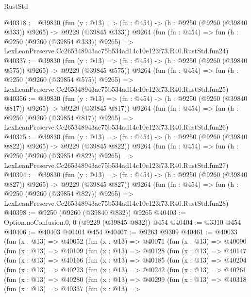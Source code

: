 \begin{lexlean}{RustStd}
\begin{coremodule}
@40318 := @39830
    (fun (y : @13) => (fn : @454) -> (h : @9250 (@9260 (@39840 @333)) @9265) -> @9229 (@39845 @333))
    @9264
    (fun (fn : @454) =>
    fun (h : @9250 (@9260 (@39854 @333)) @9265) =>
    LexLeanPreserve.Cc265348943ac75b534ad14c10e123f73.R40.RustStd.fun24)
@40337 := @39830
    (fun (y : @13) => (fn : @454) -> (h : @9250 (@9260 (@39840 @575)) @9265) -> @9229 (@39845 @575))
    @9264
    (fun (fn : @454) =>
    fun (h : @9250 (@9260 (@39854 @575)) @9265) =>
    LexLeanPreserve.Cc265348943ac75b534ad14c10e123f73.R40.RustStd.fun25)
@40356 := @39830
    (fun (y : @13) => (fn : @454) -> (h : @9250 (@9260 (@39840 @817)) @9265) -> @9229 (@39845 @817))
    @9264
    (fun (fn : @454) =>
    fun (h : @9250 (@9260 (@39854 @817)) @9265) =>
    LexLeanPreserve.Cc265348943ac75b534ad14c10e123f73.R40.RustStd.fun26)
@40375 := @39830
    (fun (y : @13) => (fn : @454) -> (h : @9250 (@9260 (@39840 @822)) @9265) -> @9229 (@39845 @822))
    @9264
    (fun (fn : @454) =>
    fun (h : @9250 (@9260 (@39854 @822)) @9265) =>
    LexLeanPreserve.Cc265348943ac75b534ad14c10e123f73.R40.RustStd.fun27)
@40394 := @39830
    (fun (y : @13) => (fn : @454) -> (h : @9250 (@9260 (@39840 @827)) @9265) -> @9229 (@39845 @827))
    @9264
    (fun (fn : @454) =>
    fun (h : @9250 (@9260 (@39854 @827)) @9265) =>
    LexLeanPreserve.Cc265348943ac75b534ad14c10e123f73.R40.RustStd.fun28)
@40398 := @9250 (@9260 (@39840 @832)) @9265
@40403 := Option.noConfusion.{0, 0} (@9229 (@39845 @832)) @454
@40404 := @3310 @454
@40406 := @40403 @40404 @454
@40407 := @9263 @9309
@40461 := @40033
    (fun (x : @13) =>
    @40052
      (fun (x : @13) =>
      @40071
        (fun (x : @13) =>
        @40090
          (fun (x : @13) =>
          @40109
            (fun (x : @13) =>
            @40128
              (fun (x : @13) =>
              @40147
                (fun (x : @13) =>
                @40166
                  (fun (x : @13) =>
                  @40185
                    (fun (x : @13) =>
                    @40204
                      (fun (x : @13) =>
                      @40223
                        (fun (x : @13) =>
                        @40242
                          (fun (x : @13) =>
                          @40261
                            (fun (x : @13) =>
                            @40280
                              (fun (x : @13) =>
                              @40299
                                (fun (x : @13) =>
                                @40318
                                  (fun (x : @13) =>
                                  @40337
                                    (fun (x : @13) =>

\end{coremodule}
\end{lexlean}
